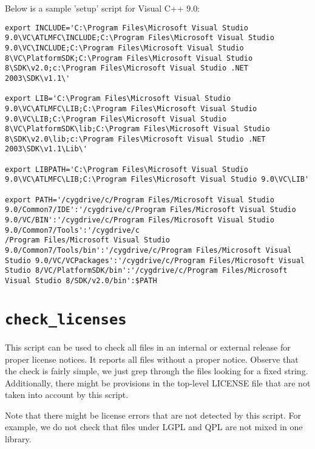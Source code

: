 Below is a sample 'setup' script for Visual C++ 9.0:

\begin{verbatim}
export INCLUDE='C:\Program Files\Microsoft Visual Studio 9.0\VC\ATLMFC\INCLUDE;C:\Program Files\Microsoft Visual Studio 9.0\VC\INCLUDE;C:\Program Files\Microsoft Visual Studio 8\VC\PlatformSDK;C:\Program Files\Microsoft Visual Studio 8\SDK\v2.0;c:\Program Files\Microsoft Visual Studio .NET 2003\SDK\v1.1\'

export LIB='C:\Program Files\Microsoft Visual Studio 9.0\VC\ATLMFC\LIB;C:\Program Files\Microsoft Visual Studio 9.0\VC\LIB;C:\Program Files\Microsoft Visual Studio 8\VC\PlatformSDK\lib;C:\Program Files\Microsoft Visual Studio 8\SDK\v2.0\lib;c:\Program Files\Microsoft Visual Studio .NET 2003\SDK\v1.1\Lib\'

export LIBPATH='C:\Program Files\Microsoft Visual Studio 9.0\VC\ATLMFC\LIB;C:\Program Files\Microsoft Visual Studio 9.0\VC\LIB'

export PATH='/cygdrive/c/Program Files/Microsoft Visual Studio 9.0/Common7/IDE':'/cygdrive/c/Program Files/Microsoft Visual Studio 9.0/VC/BIN':'/cygdrive/c/Program Files/Microsoft Visual Studio 9.0/Common7/Tools':'/cygdrive/c
/Program Files/Microsoft Visual Studio 9.0/Common7/Tools/bin':'/cygdrive/c/Program Files/Microsoft Visual Studio 9.0/VC/VCPackages':'/cygdrive/c/Program Files/Microsoft Visual Studio 8/VC/PlatformSDK/bin':'/cygdrive/c/Program Files/Microsoft Visual Studio 8/SDK/v2.0/bin':$PATH

\end{verbatim}



\section{{\tt check\_licenses}}
\label{sec:check_licenses}

This script can be used to check all files in an internal or external release
for proper license notices. It reports all files without a proper notice.
Observe that the check is fairly simple, we just grep through the files
looking for a fixed string. Additionally, there might be provisions in the
top-level LICENSE file that are not taken into account by this script.

Note that there might be license errors that are not detected by this script.
For example, we do not check that files under LGPL and QPL are not mixed in
one library.



